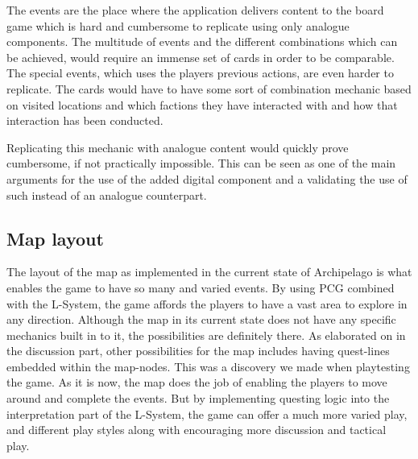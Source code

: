 The events are the place where the application delivers content to the board game which is hard and cumbersome to replicate using only analogue components. The multitude of events and the different combinations which can be achieved, would require an immense set of cards in order to be comparable. 
The special events, which uses the players previous actions, are even harder to replicate. The cards would have  to have some sort of combination mechanic based on visited locations and which factions they have interacted with and how that interaction has been conducted. 

Replicating this mechanic with analogue content would quickly prove cumbersome, if not practically impossible. 
This can be seen as one of the main arguments for the use of the added digital component and a validating the use of such instead of an analogue counterpart.

\subsection{Map layout}
The layout of the map as implemented in the current state of Archipelago is what enables the game to have so many and varied events. By using PCG combined with the L-System, the game affords the players to have a vast area to explore in any direction. Although the map in its current state does not have any specific mechanics built in to it, the possibilities are definitely there. As elaborated on in the discussion part, other possibilities for the map includes having quest-lines embedded within the map-nodes. This was a discovery we made when playtesting the game. As it is now, the map does the job of enabling the players to move around and complete the events. But by implementing questing logic into the interpretation part of the L-System, the game can offer a much more varied play, and different play styles along with encouraging more discussion and tactical play.

